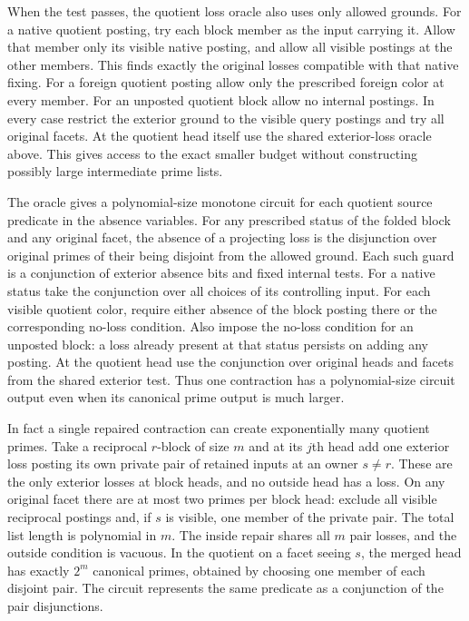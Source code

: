 When the test passes, the quotient loss
oracle also uses only allowed grounds.
For a native quotient posting, try each
block member as the input carrying it.
Allow that member only its visible native
posting, and allow all visible postings at
the other members. This finds exactly the
original losses compatible with that native
fixing. For a foreign quotient posting allow
only the prescribed foreign color at every
member. For an unposted quotient block
allow no internal postings. In every case
restrict the exterior ground to the visible
query postings and try all original facets.
At the quotient head itself use the shared
exterior-loss oracle above. This gives
access to the exact smaller budget without
constructing possibly large intermediate
prime lists.

The oracle gives a polynomial-size monotone circuit
for each quotient source predicate in the absence
variables. For any prescribed status of the folded
block and any original facet, the absence of a
projecting loss is the disjunction over original
primes of their being disjoint from the allowed
ground. Each such guard is a conjunction of
exterior absence bits and fixed internal tests.
For a native status take the conjunction over
all choices of its controlling input. For each
visible quotient color, require either absence
of the block posting there or the corresponding
no-loss condition. Also impose the no-loss
condition for an unposted block: a loss already
present at that status persists on adding any
posting. At the quotient head use the conjunction
over original heads and facets from the shared
exterior test. Thus one contraction has a
polynomial-size circuit output even when its
canonical prime output is much larger.

In fact a single repaired contraction can create
exponentially many quotient primes. Take a
reciprocal $r$-block of size $m$ and at its
$j$th head add one exterior loss posting its
own private pair of retained inputs at an owner
$s\ne r$. These are the only exterior losses at
block heads, and no outside head has a loss.
On any original facet there are at most two
primes per block head: exclude all visible
reciprocal postings and, if $s$ is visible,
one member of the private pair. The total
list length is polynomial in $m$. The inside
repair shares all $m$ pair losses, and the
outside condition is vacuous. In the quotient
on a facet seeing $s$, the merged head has
exactly $2^m$ canonical primes, obtained by
choosing one member of each disjoint pair.
The circuit represents the same predicate as
a conjunction of the pair disjunctions.

